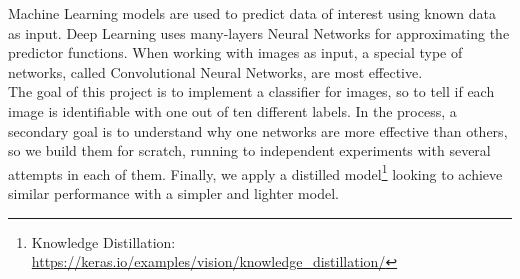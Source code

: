 \begin{center}
    \begin{minipage}{0.85\textwidth}
        Machine Learning models are used to predict data of interest using known data as input.
        Deep Learning uses many-layers Neural Networks for approximating the predictor functions.
        When working with images as input, a special type of networks, called Convolutional Neural Networks, are most effective.\\
        The goal of this project is to implement a classifier for images,
        so to tell if each image is identifiable with one out of ten different labels.
        In the process, a secondary goal is to understand why one networks are more effective than others,
        so we build them for scratch, running to independent experiments with several attempts in each of them.
        Finally, we apply a distilled model\footnote{Knowledge Distillation: \href{https://keras.io/examples/vision/knowledge\_distillation/}{https://keras.io/examples/vision/knowledge\_distillation/}}
        looking to achieve similar performance with a simpler and lighter model.
    \end{minipage}
\end{center}